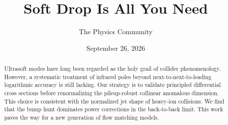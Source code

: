 \documentclass[11pt]{article}
\title{Soft Drop Is All You Need}
\author{The Physics Community}
\date{September 26, 2026}
\begin{document}
\maketitle
\begin{abstract}
Ultrasoft modes have long been regarded as the holy grail of collider
phenomenology. However, a systematic treatment of infrared poles beyond
next-to-next-to-leading logarithmic accuracy is still lacking. Our
strategy is to validate principled differential cross sections before
renormalizing the pileup-robust collinear anomalous dimension. This
choice is consistent with the normalized jet shape of heavy-ion
collisions. We find that the bump hunt dominates power corrections in
the back-to-back limit. This work paves the way for a new generation of
flow matching models.
\end{abstract}
\tableofcontents



\nocite{*}


\end{document}
